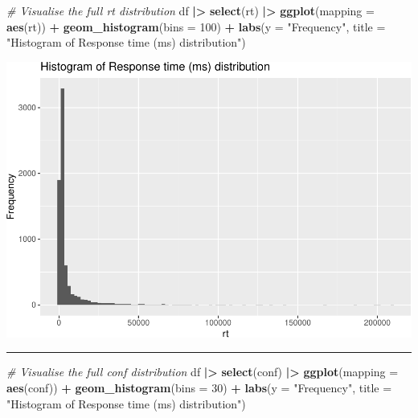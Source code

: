 \documentclass[
]{article}
\newenvironment{Shaded}{\begin{snugshade}}{\end{snugshade}}
\newcommand{\AttributeTok}[1]{\textcolor[rgb]{0.13,0.29,0.53}{#1}}
\newcommand{\CommentTok}[1]{\textcolor[rgb]{0.56,0.35,0.01}{\textit{#1}}}
\newcommand{\DecValTok}[1]{\textcolor[rgb]{0.00,0.00,0.81}{#1}}
\newcommand{\FunctionTok}[1]{\textcolor[rgb]{0.13,0.29,0.53}{\textbf{#1}}}
\newcommand{\NormalTok}[1]{#1}
\newcommand{\SpecialCharTok}[1]{\textcolor[rgb]{0.81,0.36,0.00}{\textbf{#1}}}
\newcommand{\StringTok}[1]{\textcolor[rgb]{0.31,0.60,0.02}{#1}}
\begin{document}
\begin{Shaded}
\begin{Highlighting}[]
\CommentTok{\# Visualise the full rt distribution}
\NormalTok{df }\SpecialCharTok{|\textgreater{}}
  \FunctionTok{select}\NormalTok{(rt) }\SpecialCharTok{|\textgreater{}}
  \FunctionTok{ggplot}\NormalTok{(}\AttributeTok{mapping =} \FunctionTok{aes}\NormalTok{(rt)) }\SpecialCharTok{+}
  \FunctionTok{geom\_histogram}\NormalTok{(}\AttributeTok{bins =} \DecValTok{100}\NormalTok{) }\SpecialCharTok{+} 
  \FunctionTok{labs}\NormalTok{(}\AttributeTok{y =} \StringTok{"Frequency"}\NormalTok{,}
       \AttributeTok{title =} \StringTok{"Histogram of Response time (ms) distribution"}\NormalTok{)}
\end{Highlighting}
\end{Shaded}

\includegraphics{T5_Data_wrangling_pdf_files/figure-latex/unnamed-chunk-7-1.pdf}

\begin{center}\rule{0.5\linewidth}{0.5pt}\end{center}

\begin{Shaded}
\begin{Highlighting}[]
\CommentTok{\# Visualise the full conf distribution}
\NormalTok{df }\SpecialCharTok{|\textgreater{}}
  \FunctionTok{select}\NormalTok{(conf) }\SpecialCharTok{|\textgreater{}}
  \FunctionTok{ggplot}\NormalTok{(}\AttributeTok{mapping =} \FunctionTok{aes}\NormalTok{(conf)) }\SpecialCharTok{+}
  \FunctionTok{geom\_histogram}\NormalTok{(}\AttributeTok{bins =} \DecValTok{30}\NormalTok{) }\SpecialCharTok{+} 
  \FunctionTok{labs}\NormalTok{(}\AttributeTok{y =} \StringTok{"Frequency"}\NormalTok{,}
       \AttributeTok{title =} \StringTok{"Histogram of Response time (ms) distribution"}\NormalTok{)}
\end{Highlighting}
\end{Shaded}
\end{document}
